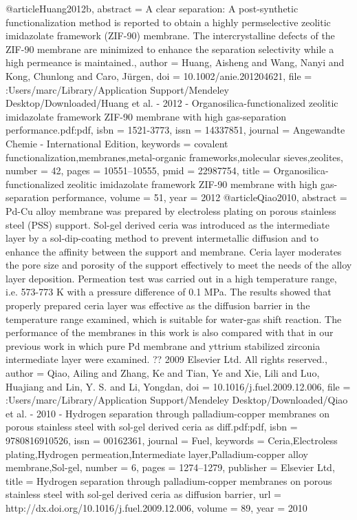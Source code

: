 @article{Huang2012b,
abstract = {A clear separation: A post-synthetic functionalization method is reported to obtain a highly permselective zeolitic imidazolate framework (ZIF-90) membrane. The intercrystalline defects of the ZIF-90 membrane are minimized to enhance the separation selectivity while a high permeance is maintained.},
author = {Huang, Aisheng and Wang, Nanyi and Kong, Chunlong and Caro, J{\"{u}}rgen},
doi = {10.1002/anie.201204621},
file = {:Users/marc/Library/Application Support/Mendeley Desktop/Downloaded/Huang et al. - 2012 - Organosilica-functionalized zeolitic imidazolate framework ZIF-90 membrane with high gas-separation performance.pdf:pdf},
isbn = {1521-3773},
issn = {14337851},
journal = {Angewandte Chemie - International Edition},
keywords = {covalent functionalization,membranes,metal-organic frameworks,molecular sieves,zeolites},
number = {42},
pages = {10551--10555},
pmid = {22987754},
title = {{Organosilica-functionalized zeolitic imidazolate framework ZIF-90 membrane with high gas-separation performance}},
volume = {51},
year = {2012}
}
@article{Qiao2010,
abstract = {Pd-Cu alloy membrane was prepared by electroless plating on porous stainless steel (PSS) support. Sol-gel derived ceria was introduced as the intermediate layer by a sol-dip-coating method to prevent intermetallic diffusion and to enhance the affinity between the support and membrane. Ceria layer moderates the pore size and porosity of the support effectively to meet the needs of the alloy layer deposition. Permeation test was carried out in a high temperature range, i.e. 573-773 K with a pressure difference of 0.1 MPa. The results showed that properly prepared ceria layer was effective as the diffusion barrier in the temperature range examined, which is suitable for water-gas shift reaction. The performance of the membranes in this work is also compared with that in our previous work in which pure Pd membrane and yttrium stabilized zirconia intermediate layer were examined. ?? 2009 Elsevier Ltd. All rights reserved.},
author = {Qiao, Ailing and Zhang, Ke and Tian, Ye and Xie, Lili and Luo, Huajiang and Lin, Y. S. and Li, Yongdan},
doi = {10.1016/j.fuel.2009.12.006},
file = {:Users/marc/Library/Application Support/Mendeley Desktop/Downloaded/Qiao et al. - 2010 - Hydrogen separation through palladium-copper membranes on porous stainless steel with sol-gel derived ceria as diff.pdf:pdf},
isbn = {9780816910526},
issn = {00162361},
journal = {Fuel},
keywords = {Ceria,Electroless plating,Hydrogen permeation,Intermediate layer,Palladium-copper alloy membrane,Sol-gel},
number = {6},
pages = {1274--1279},
publisher = {Elsevier Ltd},
title = {{Hydrogen separation through palladium-copper membranes on porous stainless steel with sol-gel derived ceria as diffusion barrier}},
url = {http://dx.doi.org/10.1016/j.fuel.2009.12.006},
volume = {89},
year = {2010}
}
